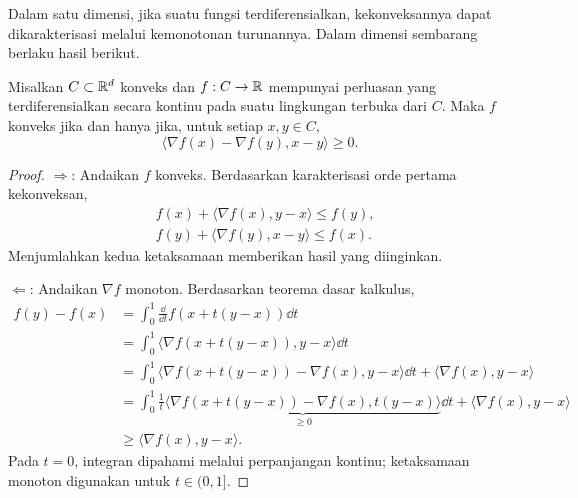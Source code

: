 Dalam satu dimensi, jika suatu fungsi terdiferensialkan, kekonveksannya dapat dikarakterisasi melalui kemonotonan turunannya. Dalam dimensi sembarang berlaku hasil berikut.

\begin{theorem}[Kemonotonan gradien]
    Misalkan $C\subset\mathbb{R}^d$ konveks dan $f:C\rightarrow\mathbb{R}$ mempunyai perluasan
    yang terdiferensialkan secara kontinu pada suatu lingkungan terbuka dari
    $C$. Maka $f$ konveks jika dan hanya jika, untuk setiap $x,y\in C$,
    \begin{equation}
        \langle\nabla f(x)-\nabla f(y),x-y\rangle\geq0.
    \end{equation}
\end{theorem}
\begin{proof}
    $\Rightarrow$: Andaikan $f$ konveks. Berdasarkan karakterisasi orde pertama kekonveksan,
    \begin{equation}
        \begin{aligned}
            &f(x)+\langle\nabla f(x),y-x\rangle\leq f(y),\\
            &f(y)+\langle\nabla f(y),x-y\rangle\leq f(x).
        \end{aligned}
    \end{equation}
    Menjumlahkan kedua ketaksamaan memberikan hasil yang diinginkan.

    $\Leftarrow$: Andaikan $\nabla f$ monoton. Berdasarkan teorema dasar kalkulus,
    \begin{equation}
        \begin{aligned}
            f(y)-f(x)
            &=\int_0^1\frac{\dd}{\dd t}f(x+t(y-x))\dd t\\
            &=\int_0^1\langle\nabla f(x+t(y-x)),y-x\rangle\dd t\\
            &=\int_0^1\langle\nabla f(x+t(y-x))-\nabla f(x),y-x\rangle\dd t+\langle\nabla f(x),y-x\rangle\\
            &=\int_0^1\frac{1}{t}\underbrace{\langle\nabla f(x+t(y-x))-\nabla f(x),t(y-x)\rangle}_{\geq0}\dd t+\langle\nabla f(x),y-x\rangle\\
            &\geq\langle\nabla f(x),y-x\rangle.
        \end{aligned}
    \end{equation}
    Pada $t=0$, integran dipahami melalui perpanjangan kontinu; ketaksamaan monoton digunakan untuk $t\in(0,1]$.
\end{proof}

